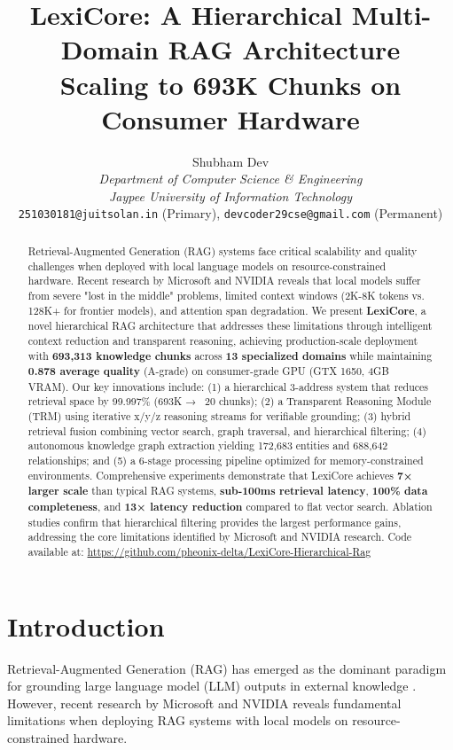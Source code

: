 \documentclass[11pt]{article}
\title{LexiCore: A Hierarchical Multi-Domain RAG Architecture\\
Scaling to 693K Chunks on Consumer Hardware}
\author{Shubham Dev \\
  \textit{Department of Computer Science \& Engineering} \\
  \textit{Jaypee University of Information Technology} \\
  \texttt{251030181@juitsolan.in} (Primary), \texttt{devcoder29cse@gmail.com} (Permanent)}
\date{}
\begin{document}
\maketitle
\thispagestyle{fancy}

\begin{abstract}
Retrieval-Augmented Generation (RAG) systems face critical scalability and quality challenges when deployed with local language models on resource-constrained hardware. Recent research by Microsoft and NVIDIA reveals that local models suffer from severe "lost in the middle" problems, limited context windows (2K-8K tokens vs. 128K+ for frontier models), and attention span degradation. We present \textbf{LexiCore}, a novel hierarchical RAG architecture that addresses these limitations through intelligent context reduction and transparent reasoning, achieving production-scale deployment with \textbf{693,313 knowledge chunks} across \textbf{13 specialized domains} while maintaining \textbf{0.878 average quality} (A-grade) on consumer-grade GPU (GTX 1650, 4GB VRAM). Our key innovations include: (1) a hierarchical 3-address system that reduces retrieval space by 99.997\% (693K → ~20 chunks); (2) a Transparent Reasoning Module (TRM) using iterative x/y/z reasoning streams for verifiable grounding; (3) hybrid retrieval fusion combining vector search, graph traversal, and hierarchical filtering; (4) autonomous knowledge graph extraction yielding 172,683 entities and 688,642 relationships; and (5) a 6-stage processing pipeline optimized for memory-constrained environments. Comprehensive experiments demonstrate that LexiCore achieves \textbf{7× larger scale} than typical RAG systems, \textbf{sub-100ms retrieval latency}, \textbf{100\% data completeness}, and \textbf{13× latency reduction} compared to flat vector search. Ablation studies confirm that hierarchical filtering provides the largest performance gains, addressing the core limitations identified by Microsoft and NVIDIA research. Code available at: \url{https://github.com/pheonix-delta/LexiCore-Hierarchical-Rag}
\end{abstract}

\section{Introduction}

Retrieval-Augmented Generation (RAG) has emerged as the dominant paradigm for grounding large language model (LLM) outputs in external knowledge \cite{lewis2020retrieval}. However, recent research by Microsoft \cite{liu2023lost} and NVIDIA \cite{nvidia2024rag} reveals fundamental limitations when deploying RAG systems with local models on resource-constrained hardware.
\end{document}
